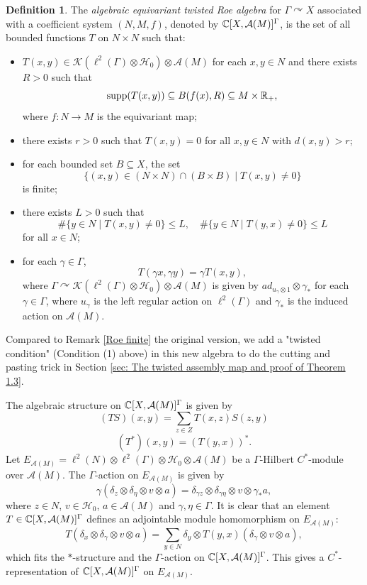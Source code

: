 \documentclass[11pt]{article}
\theoremstyle{definition}
\newtheorem{Def}{Definition}[section]
\theoremstyle{plain}
\def\A{\mathcal A}\def\C{\mathcal C}\def\B{\mathcal B}\def\E{\mathcal E}\def\O{\mathcal O}\def\h{\mathfrak h}\def\K{\mathcal K}\def\F{\mathcal F}\def\P{\mathcal P}\def\L{\mathcal L}\def\R{\mathcal R}\def\Q{\mathcal Q}\def\H{\mathcal H}\def\S{\mathcal S}\def\N{\mathcal N}\def\U{\mathcal U}\def\V{\mathcal V}
\def\supp{\textup{supp}}
\def\ox{\otimes}
\def\ox{\otimes}
\def\Ga{\Gamma}
\def\car{\curvearrowright}
\begin{document}
\begin{Def}\label{twisted Roe small}
The \emph{algebraic equivariant twisted Roe algebra} for $\Ga\car X$ associated with a coefficient system $(N,M,f)$, denoted by $\IC[X,\A(M)]^{\Ga}$, is the set of all bounded functions $T$ on $N\times N$ such that:\begin{itemize}
\item[(1)] $T(x,y)\in\K(\ell^2(\Ga)\ox\H_0)\ox\A(M)$ for each $x,y\in N$ and there exists $R>0$ such that
$$\supp(T(x,y))\subseteq B(f(x),R)\subseteq M\times\IR_+,$$
where $f:N\to M$ is the equivariant map;
\item[(2)] there exists $r>0$ such that $T(x,y)=0$ for all $x,y\in N$ with $d(x,y)>r$;
\item[(3)] for each bounded set $B\subseteq X$, the set
$$\{(x,y)\in (N\times N)\cap (B\times B)\mid T(x,y)\ne0\}$$
is finite;
\item[(4)]there exists $L>0$ such that
$$\#\{y\in N\mid T(x,y)\ne0\}\leq L,\quad\#\{y\in N\mid T(y,x)\ne0\}\leq L$$
for all $x\in N$;
\item[(5)] for each $\gamma\in\Ga$,
$$T(\gamma x,\gamma y)=\gamma T(x,y),$$
where $\Ga\car\K(\ell^2(\Ga)\ox\H_0)\ox\A(M)$ is given by $ad_{u_{\gamma}\ox 1}\ox \gamma_*$ for each $\gamma\in\Ga$, where $u_{\gamma}$ is the left regular action on $\ell^2(\Ga)$ and $\gamma_*$ is the induced action on $\A(M)$.
\end{itemize}\end{Def}

Compared to Remark \ref{Roe finite} the original version, we add a "twisted condition" (Condition (1) above) in this new algebra to do the cutting and pasting trick in Section \ref{sec: The twisted assembly map and proof of Theorem 1.3}.

The algebraic structure on $\IC[X,\A(M)]^{\Ga}$ is given by
$$(TS)(x,y)=\sum_{z\in Z}T(x,z)S(z,y)$$
$$(T^*)(x,y)=(T(y,x))^*.$$
Let $E_{\A(M)}=\ell^2(N)\ox\ell^2(\Ga)\ox\H_0\ox\A(M)$ be a $\Ga$-Hilbert $C^*$-module over $\A(M)$. The $\Ga$-action on $E_{\A(M)}$ is given by
$$\gamma(\delta_z\ox\delta_{\eta}\ox v\ox a)=\delta_{\gamma z}\ox\delta_{\gamma\eta}\ox v\ox \gamma_*a,$$
where $z\in N$, $v\in\H_0$, $a\in\A(M)$ and $\gamma,\eta\in\Ga$. It is clear that an element $T\in\IC[X,\A(M)]^{\Ga}$ defines an adjointable module homomorphism on $E_{\A(M)}$:
$$T(\delta_x\ox\delta_{\gamma}\ox v\ox a)=\sum_{y\in N}\delta_y\ox T(y,x)(\delta_{\gamma}\ox v\ox a),$$
which fits the $*$-structure and the $\Ga$-action on $\IC[X,\A(M)]^{\Ga}$. This gives a $C^*$-representation of $\IC[X,\A(M)]^{\Ga}$ on $E_{\A(M)}$.
\end{document}
